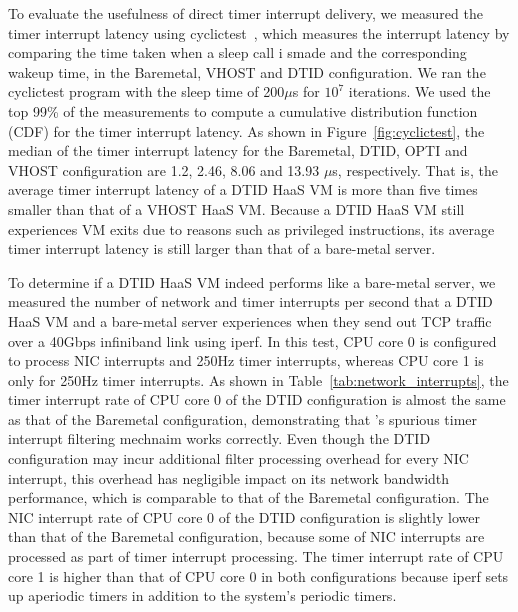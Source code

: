 To evaluate the usefulness of direct timer interrupt delivery, we 
measured the timer interrupt latency using cyclictest~\cite{cyclictest}, which 
measures the interrupt latency by comparing the time taken when a sleep 
call i smade and the corresponding wakeup time,  in the Baremetal, VHOST and DTID configuration.
We ran the cyclictest program with the sleep time of 200$\mu$s for $10^7$
iterations. 
We used the top 99\% of the measurements to compute a cumulative distribution function (CDF)
for the timer interrupt latency. As shown in Figure~\ref{fig:cyclictest}, the 
median of the timer interrupt latency for the Baremetal, DTID, OPTI and
VHOST configuration are 1.2, 2.46, 8.06 and 13.93 $\mu$s, respectively.
That is, the average timer interrupt latency of a DTID HaaS VM is 
more than five times smaller than that of a VHOST HaaS VM.
Because a DTID HaaS VM still experiences VM exits due to reasons such as privileged instructions,
its average timer interrupt latency is still larger than that of a bare-metal server.


To determine if a DTID HaaS VM indeed performs like a bare-metal server,
we measured the number of network and timer interrupts per second that a DTID HaaS VM and a bare-metal server
experiences when they send out TCP traffic over a 40Gbps infiniband link using iperf.
In this test, CPU core 0 is configured to process NIC interrupts and 250Hz timer interrupts, whereas CPU core 1 is only for 250Hz timer interrupts.
As shown in Table~\ref{tab:network_interrupts},
the timer interrupt rate of CPU core 0 of the DTID configuration is almost the same as that of the Baremetal configuration, 
demonstrating that \sna's spurious timer interrupt filtering mechnaim works correctly. 
Even though the DTID configuration may incur additional filter processing overhead for every NIC interrupt,
this overhead has negligible impact on its network bandwidth performance, which is comparable to that of the Baremetal 
configuration.   
The NIC interrupt rate of CPU core 0 of the DTID configuration is slightly lower than that of the Baremetal configuration, 
because some of NIC interrupts are processed as part of timer interrupt processing.
The timer interrupt rate of CPU core 1 is higher than that of CPU core 0 in both configurations because iperf sets up aperiodic
timers in addition to the system's periodic timers. 




